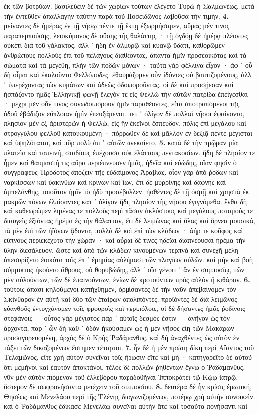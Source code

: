\documentclass[a4paper, 11pt, oneside, polutonikogreek, german]{article}
\begin{document}
ἐκ τῶν βοτρύων. βασιλεύειν δὲ τῶν χωρίων τούτων ἐλέγετο Τυρὼ ἡ Σαλμωνέως, μετὰ τὴν ἐντεῦθεν ἀπαλλαγὴν ταύτην παρὰ τοῦ Ποσειδῶνος λαβοῦσα τὴν τιμήν. \textbf{4.} μείναντες δὲ ἡμέρας ἐν τῇ νήσῳ πέντε τῇ ἕκτῃ ἐξωρμήσαμεν, αὔρας μέν τινος παραπεμπούσης, λειοκύμονος δὲ οὔσης τῆς θαλάττης · τῇ ὀγδόῃ δὲ ἡμέρᾳ πλέοντες οὐκέτι διὰ τοῦ γάλακτος, ἀλλ ᾽ ἤδη ἐν ἁλμυρῷ καὶ κυανῷ ὕδατι, καθορῶμεν ἀνθρώπους πολλοὺς ἐπὶ τοῦ πελάγους διαθέοντας, ἅπαντα ἡμῖν προσεοικότας καὶ τὰ σώματα καὶ τὰ μεγέθη, πλὴν τῶν ποδῶν μόνων · ταῦτα γὰρ φέλλινα εἶχον · ἀφ ᾽ οὗ δὴ οἶμαι καὶ ἐκαλοῦντο Φελλόποδες. ἐθαυμάζομεν οὖν ἰδόντες οὐ βαπτιζομένους, ἀλλ ᾽ ὑπερέχοντας τῶν κυμάτων καὶ ἀδεῶς ὁδοιποροῦντας. οἱ δὲ καὶ προσῄεσαν καὶ ἠσπάζοντο ἡμᾶς Ἑλληνικῇ φωνῇ ἔλεγόν τε εἰς Φελλὼ τὴν αὐτῶν πατρίδα ἐπείγεσθαι · μέχρι μὲν οὖν τινος συνωδοιπόρουν ἡμῖν παραθέοντες, εἶτα ἀποτραπόμενοι τῆς ὁδοῦ ἐβάδιζον εὔπλοιαν ἡμῖν ἐπευξάμενοι. μετ ᾽ ὀλίγον δὲ πολλαὶ νῆσοι ἐφαίνοντο, πλησίον μὲν ἐξ ἀριστερῶν ἡ Φελλώ, εἰς ἣν ἐκεῖνοι ἔσπευδον, πόλις ἐπὶ μεγάλου καὶ στρογγύλου φελλοῦ κατοικουμένη · πόρρωθεν δὲ καὶ μᾶλλον ἐν δεξιᾷ πέντε μέγισται καὶ ὑψηλόταται, καὶ πῦρ πολὺ ἀπ ᾽ αὐτῶν ἀνεκαίετο. \textbf{5.} κατὰ δὲ τὴν πρῷραν μία πλατεῖα καὶ ταπεινή, σταδίους ἐπέχουσα οὐκ ἐλάττους πεντακοσίων. ἤδη δὲ πλησίον τε ἦμεν καὶ θαυμαστή τις αὔρα περιέπνευσεν ἡμᾶς, ἡδεῖα καὶ εὐώδης, οἵαν φησὶν ὁ συγγραφεὺς Ἡρόδοτος ἀπόζειν τῆς εὐδαίμονος Ἀραβίας. οἷον γὰρ ἀπὸ ῥόδων καὶ ναρκίσσων καὶ ὑακίνθων καὶ κρίνων καὶ ἴων, ἔτι δὲ μυρρίνης καὶ δάφνης καὶ ἀμπελάνθης, τοιοῦτον ἡμῖν τὸ ἡδὺ προσέβαλλεν. ἡσθέντες δὲ τῇ ὀσμῇ καὶ χρηστὰ ἐκ μακρῶν πόνων ἐλπίσαντες κατ ᾽ ὀλίγον ἤδη πλησίον τῆς νήσου ἐγιγνόμεθα. ἔνθα δὴ καὶ καθεωρῶμεν λιμένας τε πολλοὺς περὶ πᾶσαν ἀκλύστους καὶ μεγάλους ποταμούς τε διαυγεῖς ἐξιόντας ἠρέμα ἐς τὴν θάλατταν, ἔτι δὲ λειμῶνας καὶ ὕλας καὶ ὄρνεα μουσικά, τὰ μὲν ἐπὶ τῶν ἠϊόνων ᾄδοντα, πολλὰ δὲ καὶ ἐπὶ τῶν κλάδων · ἀήρ τε κοῦφος καὶ εὔπνους περιεκέχυτο τὴν χώραν · καὶ αὖραι δέ τινες ἡδεῖαι διαπνέουσαι ἠρέμα τὴν ὕλην διεσάλευον, ὥστε καὶ ἀπὸ τῶν κλάδων κινουμένων τερπνὰ καὶ συνεχῆ μέλη ἀπεσυρίζετο ἐοικότα τοῖς ἐπ ᾽ ἐρημίας αὐλήμασι τῶν πλαγίων αὐλῶν. καὶ μὴν καὶ βοὴ σύμμικτος ἠκούετο ἄθρους, οὐ θορυβώδης, ἀλλ ᾽ οἵα γένοιτ ᾽ ἂν ἐν συμποσίῳ, τῶν μὲν αὐλούντων, τῶν δὲ ἐπαινούντων, ἐνίων δὲ κροτούντων πρὸς αὐλὸν ἢ κιθάραν. \textbf{6.} τούτοις ἅπασι κηλούμενοι κατήχθημεν, ὁρμίσαντες δὲ τὴν ναῦν ἀπεβαίνομεν τὸν Σκίνθαρον ἐν αὐτῇ καὶ δύο τῶν ἑταίρων ἀπολιπόντες. προϊόντες δὲ διὰ λειμῶνος εὐανθοῦς ἐντυγχάνομεν τοῖς φρουροῖς καὶ περιπόλοις, οἱ δὲ δήσαντες ἡμᾶς ῥοδίνοις στεφάνοις --- οὗτος γὰρ μέγιστος παρ ᾽ αὐτοῖς δεσμός ἐστιν --- ἀνῆγον ὡς τὸν ἄρχοντα, παρ ᾽ ὧν δὴ καθ ᾽ ὁδὸν ἠκούσαμεν ὡς ἡ μὲν νῆσος εἴη τῶν Μακάρων προσαγορευομένη, ἀρχὸς δὲ ὁ Κρὴς Ῥαδάμανθυς. καὶ δὴ ἀναχθέντες ὡς αὐτὸν ἐν τάξει τῶν δικαζομένων ἔστημεν τέταρτοι. \textbf{7.} ἦν δὲ ἡ μὲν πρώτη δίκη περὶ Αἴαντος τοῦ Τελαμῶνος, εἴτε χρὴ αὐτὸν συνεῖναι τοῖς ἥρωσιν εἴτε καὶ μή · κατηγορεῖτο δὲ αὐτοῦ ὅτι μεμήνοι καὶ ἑαυτὸν ἀποκτάνοι. τέλος δὲ πολλῶν ῥηθέντων ἔγνω ὁ Ῥαδάμανθυς, νῦν μὲν αὐτὸν πιόμενον τοῦ ἐλλεβόρου παραδοθῆναι Ἱπποκράτει τῷ Κῴῳ ἰατρῷ, ὕστερον δὲ σωφρονήσαντα μετέχειν τοῦ συμποσίου. \textbf{8.} δευτέρα δὲ ἦν κρίσις ἐρωτική, Θησέως καὶ Μενελάου περὶ τῆς Ἑλένης διαγωνιζομένων, ποτέρῳ χρὴ αὐτὴν συνοικεῖν. καὶ ὁ Ῥαδάμανθυς ἐδίκασε Μενελάῳ συνεῖναι αὐτὴν ἅτε καὶ τοσαῦτα πονήσαντι καὶ 
\end{document}
